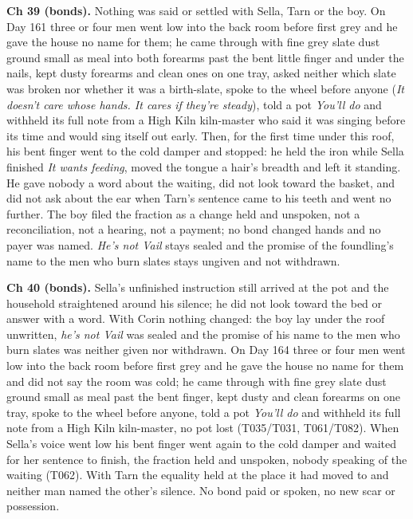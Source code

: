 \documentclass{design/chronicle}
\begin{document}
{\textbf{Ch 39 (bonds).} Nothing was said or settled with Sella, Tarn or the boy. On Day 161 three or four men went low into the back room before first grey and he gave the house no name for them; he came through with fine grey slate dust ground small as meal into both forearms past the bent little finger and under the nails, kept dusty forearms and clean ones on one tray, asked neither which slate was broken nor whether it was a birth-slate, spoke to the wheel before anyone (\emph{It doesn’t care whose hands. It cares if they’re steady}), told a pot \emph{You’ll do} and withheld its full note from a High Kiln kiln-master who said it was singing before its time and would sing itself out early. Then, for the first time under this roof, his bent finger went to the cold damper and stopped: he held the iron while Sella finished \emph{It wants feeding}, moved the tongue a hair’s breadth and left it standing. He gave nobody a word about the waiting, did not look toward the basket, and did not ask about the ear when Tarn’s sentence came to his teeth and went no further. The boy filed the fraction as a change held and unspoken, not a reconciliation, not a hearing, not a payment; no bond changed hands and no payer was named. \emph{He’s not Vail} stays sealed and the promise of the foundling’s name to the men who burn slates stays ungiven and not withdrawn.

\textbf{Ch 40 (bonds).} Sella’s unfinished instruction still arrived at the pot and the household straightened around his silence; he did not look toward the bed or answer with a word. With Corin nothing changed: the boy lay under the roof unwritten, \emph{he’s not Vail} was sealed and the promise of his name to the men who burn slates was neither given nor withdrawn. On Day 164 three or four men went low into the back room before first grey and he gave the house no name for them and did not say the room was cold; he came through with fine grey slate dust ground small as meal past the bent finger, kept dusty and clean forearms on one tray, spoke to the wheel before anyone, told a pot \emph{You’ll do} and withheld its full note from a High Kiln kiln-master, no pot lost (T035/T031, T061/T082). When Sella’s voice went low his bent finger went again to the cold damper and waited for her sentence to finish, the fraction held and unspoken, nobody speaking of the waiting (T062). With Tarn the equality held at the place it had moved to and neither man named the other’s silence. No bond paid or spoken, no new scar or possession.

}
\end{document}
